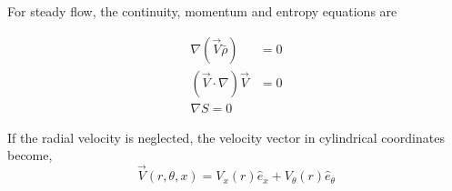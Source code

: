 For steady flow, the continuity, momentum and entropy equations are

\begin{align}
    \nabla (\vec{V} \bar{\rho}) &=  0 \\
(\vec{V}\cdot \nabla) \vec{V} &=  0\\
\nabla S = 0
\end{align}
\[\]

If the radial velocity is neglected, the velocity vector in cylindrical coordinates 
become,
\[\vec{V}(r,\theta,x) = V_x(r) \hat{e}_x + V_{\theta} (r) \hat{e}_{\theta} \]

